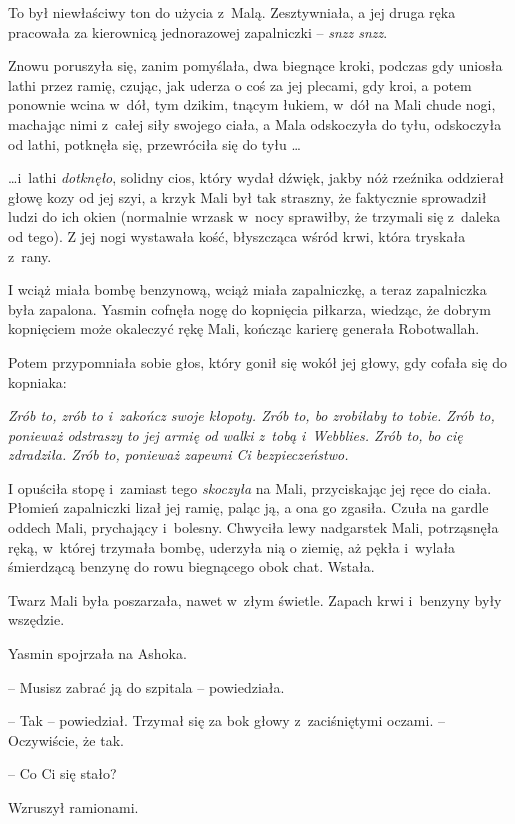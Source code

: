 \documentclass[oneside,polish,11pt,rmheadings]{mwbk}
\begin{document}
To był niewłaściwy ton do użycia z~Malą. Zesztywniała, a jej druga ręka pracowała za kierownicą jednorazowej zapalniczki -- \textit{snzz snzz}.

Znowu poruszyła się, zanim pomyślała, dwa biegnące kroki, podczas gdy uniosła lathi przez ramię, czując, jak uderza o coś za jej plecami, gdy kroi, a potem ponownie wcina w~dół, tym dzikim, tnącym łukiem, w~dół na Mali chude nogi, machając nimi z~całej siły swojego ciała, a Mala odskoczyła do tyłu, odskoczyła od lathi, potknęła się, przewróciła się do tyłu \ldots 

 \ldots  i~lathi \textit{dotknęło}, solidny cios, który wydał dźwięk, jakby nóż rzeźnika oddzierał głowę kozy od jej szyi, a krzyk Mali był tak straszny, że faktycznie sprowadził ludzi do ich okien (normalnie wrzask w~nocy sprawiłby, że trzymali się z~daleka od tego). Z jej nogi wystawała kość, błyszcząca wśród krwi, która tryskała z~rany.

I wciąż miała bombę benzynową, wciąż miała zapalniczkę, a teraz zapalniczka była zapalona. Yasmin cofnęła nogę do kopnięcia piłkarza, wiedząc, że dobrym kopnięciem może okaleczyć rękę Mali, kończąc karierę generała Robotwallah.

Potem przypomniała sobie głos, który gonił się wokół jej głowy, gdy cofała się do kopniaka:

\textit{Zrób to, zrób to i~zakończ swoje kłopoty. Zrób to, bo zrobiłaby to tobie. Zrób to, ponieważ odstraszy to jej armię od walki z~tobą i~Webblies. Zrób to, bo cię zdradziła. Zrób to, ponieważ zapewni Ci bezpieczeństwo.}

I opuściła stopę i~zamiast tego \textit{skoczyła }na Mali, przyciskając jej ręce do ciała. Płomień zapalniczki lizał jej ramię, paląc ją, a ona go zgasiła. Czuła na gardle oddech Mali, prychający i~bolesny. Chwyciła lewy nadgarstek Mali, potrząsnęła ręką, w~której trzymała bombę, uderzyła nią o ziemię, aż pękła i~wylała śmierdzącą benzynę do rowu biegnącego obok chat. Wstała.

Twarz Mali była poszarzała, nawet w~złym świetle. Zapach krwi i~benzyny były wszędzie.

Yasmin spojrzała na Ashoka. 

-- Musisz zabrać ją do szpitala -- powiedziała.

-- Tak -- powiedział. Trzymał się za bok głowy z~zaciśniętymi oczami. -- Oczywiście, że tak. 

-- Co Ci się stało? 

Wzruszył ramionami. 
\end{document}
